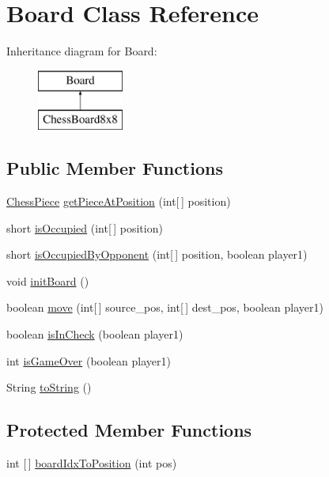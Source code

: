 \hypertarget{class_board}{}\section{Board Class Reference}
\label{class_board}
Inheritance diagram for Board\+:\begin{figure}[H]
\begin{center}
\leavevmode
\includegraphics[height=2.000000cm]{class_board}
\end{center}
\end{figure}
\subsection*{Public Member Functions}
\begin{DoxyCompactItemize}
\item 
\mbox{\hyperlink{class_chess_piece}{Chess\+Piece}} \mbox{\hyperlink{class_board_a2d576d78510ea4ebc9ec4036d782cd59}{get\+Piece\+At\+Position}} (int\mbox{[}$\,$\mbox{]} position)
\item 
short \mbox{\hyperlink{class_board_a74571b89bb29e12e8db706c6a8c7705b}{is\+Occupied}} (int\mbox{[}$\,$\mbox{]} position)
\item 
short \mbox{\hyperlink{class_board_a279849fba32fb36350e9dc06cdccb3f5}{is\+Occupied\+By\+Opponent}} (int\mbox{[}$\,$\mbox{]} position, boolean player1)
\item 
void \mbox{\hyperlink{class_board_afe083a69852c9d95ef3f212d5767b1ac}{init\+Board}} ()
\item 
boolean \mbox{\hyperlink{class_board_a0b51fa3d721412f18d84f10aa4c4f427}{move}} (int\mbox{[}$\,$\mbox{]} source\+\_\+pos, int\mbox{[}$\,$\mbox{]} dest\+\_\+pos, boolean player1)
\item 
boolean \mbox{\hyperlink{class_board_ae569166b69247afb243102a1b44f629c}{is\+In\+Check}} (boolean player1)
\item 
int \mbox{\hyperlink{class_board_a8e6efbc4d3b024ca11d5037962c01283}{is\+Game\+Over}} (boolean player1)
\item 
String \mbox{\hyperlink{class_board_aa0eb1bce909ddaa777b95bdaa003f727}{to\+String}} ()
\end{DoxyCompactItemize}
\subsection*{Protected Member Functions}
\begin{DoxyCompactItemize}
\item 
int \mbox{[}$\,$\mbox{]} \mbox{\hyperlink{class_board_a55a61aea44ab1a05806e5195ad5645b5}{board\+Idx\+To\+Position}} (int pos)
\end{DoxyCompactItemize}

